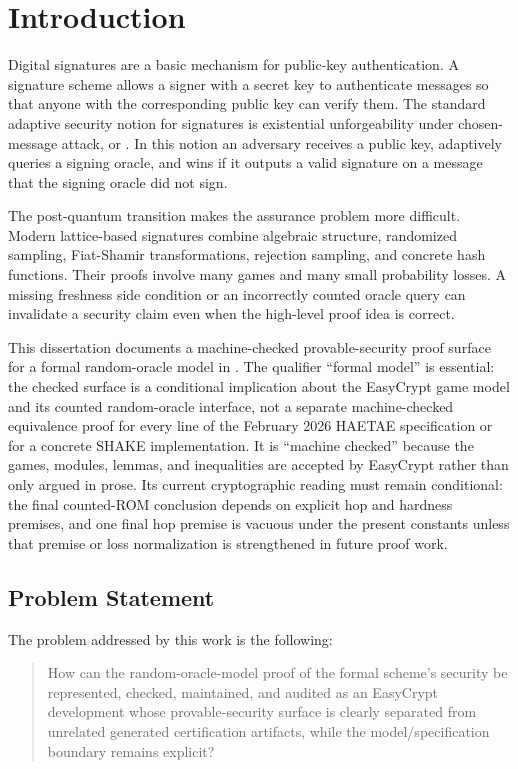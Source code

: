 \chapter{Introduction}
\label{ch:introduction}

Digital signatures are a basic mechanism for public-key authentication.  A
signature scheme allows a signer with a secret key to authenticate messages so
that anyone with the corresponding public key can verify them.  The standard
adaptive security notion for signatures is existential unforgeability under
chosen-message attack, or \eufcma{}.  In this notion an adversary receives a
public key, adaptively queries a signing oracle, and wins if it outputs a valid
signature on a message that the signing oracle did not sign.

The post-quantum transition makes the assurance problem more difficult.  Modern
lattice-based signatures combine algebraic structure, randomized sampling,
Fiat-Shamir transformations, rejection sampling, and concrete hash functions.
Their proofs involve many games and many small probability losses.  A missing
freshness side condition or an incorrectly counted oracle query can invalidate a
security claim even when the high-level proof idea is correct.

This dissertation documents a machine-checked provable-security proof surface
for a formal \haetae{} random-oracle model in \easycrypt{}.  The qualifier
``formal model'' is essential: the checked surface is a conditional implication
about the EasyCrypt game model and its counted random-oracle interface, not a
separate machine-checked equivalence proof for every line of the February 2026
HAETAE specification or for a concrete SHAKE implementation.  It is
``machine checked'' because the games, modules, lemmas, and inequalities are
accepted by EasyCrypt rather than only argued in prose.  Its current
cryptographic reading must remain conditional: the final counted-ROM conclusion
depends on explicit hop and hardness premises, and one final hop premise is
vacuous under the present  constants unless
that premise or loss normalization is strengthened in future proof work.

\section{Problem Statement}

The problem addressed by this work is the following:

\begin{quote}
How can the random-oracle-model proof of the formal \haetae{} scheme's
\eufcma{} security be represented, checked, maintained, and audited as an
EasyCrypt development whose provable-security surface is clearly separated from
unrelated generated certification artifacts, while the model/specification
boundary remains explicit?
\end{quote}

